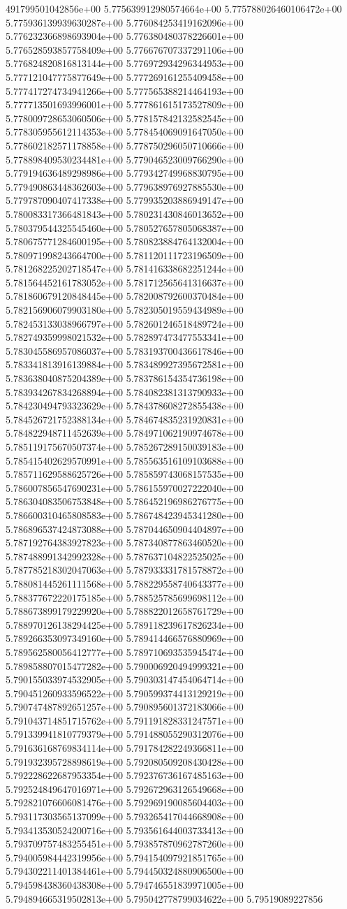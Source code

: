 491799501042856e+00	5.775639912980574664e+00	5.775788026460106472e+00	5.775936139939630287e+00	5.776084253419162096e+00	5.776232366898693904e+00	5.776380480378226601e+00	5.776528593857758409e+00	5.776676707337291106e+00	5.776824820816813144e+00	5.776972934296344953e+00	5.777121047775877649e+00	5.777269161255409458e+00	5.777417274734941266e+00	5.777565388214464193e+00	5.777713501693996001e+00	5.777861615173527809e+00	5.778009728653060506e+00	5.778157842132582545e+00	5.778305955612114353e+00	5.778454069091647050e+00	5.778602182571178858e+00	5.778750296050710666e+00	5.778898409530234481e+00	5.779046523009766290e+00	5.779194636489298986e+00	5.779342749968830795e+00	5.779490863448362603e+00	5.779638976927885530e+00	5.779787090407417338e+00	5.779935203886949147e+00	5.780083317366481843e+00	5.780231430846013652e+00	5.780379544325545460e+00	5.780527657805068387e+00	5.780675771284600195e+00	5.780823884764132004e+00	5.780971998243664700e+00	5.781120111723196509e+00	5.781268225202718547e+00	5.781416338682251244e+00	5.781564452161783052e+00	5.781712565641316637e+00	5.781860679120848445e+00	5.782008792600370484e+00	5.782156906079903180e+00	5.782305019559434989e+00	5.782453133038966797e+00	5.782601246518489724e+00	5.782749359998021532e+00	5.782897473477553341e+00	5.783045586957086037e+00	5.783193700436617846e+00	5.783341813916139884e+00	5.783489927395672581e+00	5.783638040875204389e+00	5.783786154354736198e+00	5.783934267834268894e+00	5.784082381313790933e+00	5.784230494793323629e+00	5.784378608272855438e+00	5.784526721752388134e+00	5.784674835231920831e+00	5.784822948711452639e+00	5.784971062190974678e+00	5.785119175670507374e+00	5.785267289150039183e+00	5.785415402629570991e+00	5.785563516109103688e+00	5.785711629588625726e+00	5.785859743068157535e+00	5.786007856547690231e+00	5.786155970027222040e+00	5.786304083506753848e+00	5.786452196986276775e+00	5.786600310465808583e+00	5.786748423945341280e+00	5.786896537424873088e+00	5.787044650904404897e+00	5.787192764383927823e+00	5.787340877863460520e+00	5.787488991342992328e+00	5.787637104822525025e+00	5.787785218302047063e+00	5.787933331781578872e+00	5.788081445261111568e+00	5.788229558740643377e+00	5.788377672220175185e+00	5.788525785699698112e+00	5.788673899179229920e+00	5.788822012658761729e+00	5.788970126138294425e+00	5.789118239617826234e+00	5.789266353097349160e+00	5.789414466576880969e+00	5.789562580056412777e+00	5.789710693535945474e+00	5.789858807015477282e+00	5.790006920494999321e+00	5.790155033974532905e+00	5.790303147454064714e+00	5.790451260933596522e+00	5.790599374413129219e+00	5.790747487892651257e+00	5.790895601372183066e+00	5.791043714851715762e+00	5.791191828331247571e+00	5.791339941810779379e+00	5.791488055290312076e+00	5.791636168769834114e+00	5.791784282249366811e+00	5.791932395728898619e+00	5.792080509208430428e+00	5.792228622687953354e+00	5.792376736167485163e+00	5.792524849647016971e+00	5.792672963126549668e+00	5.792821076606081476e+00	5.792969190085604403e+00	5.793117303565137099e+00	5.793265417044668908e+00	5.793413530524200716e+00	5.793561644003733413e+00	5.793709757483255451e+00	5.793857870962787260e+00	5.794005984442319956e+00	5.794154097921851765e+00	5.794302211401384461e+00	5.794450324880906500e+00	5.794598438360438308e+00	5.794746551839971005e+00	5.794894665319502813e+00	5.795042778799034622e+00	5.79519089227856